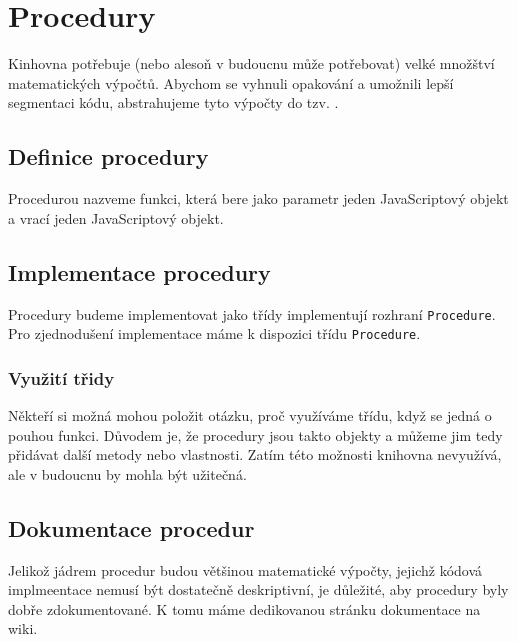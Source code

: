 \chapter{Procedury}
\label{chap:procedures}

Kinhovna potřebuje (nebo alesoň v budoucnu může potřebovat) velké množštví matematických výpočtů.
Abychom se vyhnuli opakování a umožnili lepší segmentaci kódu, abstrahujeme tyto výpočty do tzv. .

\section[Definice]{Definice procedury}
\label{sec:procedure-definition}

Procedurou nazveme  funkci, která bere jako parametr jeden JavaScriptový objekt a vrací jeden JavaScriptový objekt.

\section[Implementace]{Implementace procedury}
\label{sec:procedure-implementation}

Procedury budeme implementovat jako třídy implementují rozhraní \texttt{Procedure}\cite{geometryjs:source:interfaces:procedure.ts}.
Pro zjednodušení implementace máme k dispozici třídu \texttt{Procedure}\cite{geometryjs:source:procedures:procedure.ts}.

\subsection{Využití třidy}
\label{subsec:procedure-usage-of-class}

Někteří si možná mohou položit otázku, proč využíváme třídu, když se jedná o pouhou funkci.
Důvodem je, že procedury jsou takto objekty a můžeme jim tedy přidávat další metody nebo vlastnosti.
Zatím této možnosti knihovna nevyužívá, ale v budoucnu by mohla být užitečná.

\section[Dokumentace]{Dokumentace procedur}
\label{sec:procedure-documentation}

Jelikož jádrem procedur budou většinou matematické výpočty, jejichž kódová implmeentace nemusí být dostatečně deskriptivní, je důležité, aby procedury byly dobře zdokumentované.
K tomu máme dedikovanou stránku dokumentace na wiki\cite{geometryjs:wiki:procedures}.


